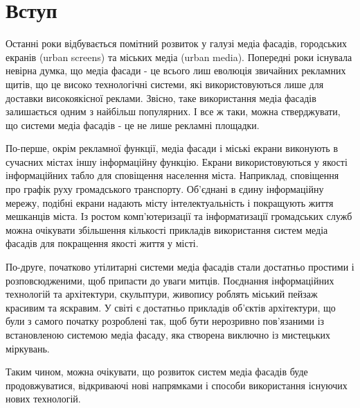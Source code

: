 \documentclass[a4paper,ukrainian,utf8,nocolumnsxix,floatsection,equationsection]{eskdtext}
\newcommand{\sectionnonum}[1]{\section*{#1}\addcontentsline{toc}{section}{#1}}
\begin{document}


{}






\tableofcontents


\sectionnonum{Вступ}
\label{sec:intro}

Останні роки відбувається помітний розвиток у галузі медіа фасадів, городських екранів (urban screens) та міських медіа (urban media). Попередні роки існувала невірна думка, що медіа фасади - це всього лиш еволюція звичайних рекламних щитів, що це високо технологічні системи, які використовуються лише для доставки високоякісної реклами. Звісно, таке використання медіа фасадів залишається одним з найбільш популярних. І все ж таки, можна стверджувати, що системи медіа фасадів - це не лише рекламні площадки. 

По-перше, окрім рекламної функції, медіа фасади і міські екрани виконують в сучасних містах іншу інформаційну функцію. Екрани використовуються у якості інформаційних табло для сповіщення населення міста. Наприклад, сповіщення про графік руху громадського транспорту. Об’єднані в єдину інформаційну мережу, подібні екрани надають місту інтелектуальність і покращують життя мешканців міста. Із ростом комп’ютеризації та інформатизації громадських служб можна очікувати збільшення кількості прикладів використання систем медіа фасадів для покращення якості життя у місті.

По-друге, початково утілитарні системи медіа фасадів стали достатньо простими і розповсюдженими, щоб припасти до уваги митців. Поєднання інформаційних технологій та архітектури, скульптури, живопису роблять міський пейзаж красивим та яскравим. У світі є достатньо прикладів об’єктів архітектури, що були з самого початку розроблені так, щоб бути нерозривно пов’язаними із встановленою системою медіа фасаду, яка створена виключно із мистецьких міркувань. 

Таким чином, можна очікувати, що розвиток систем медіа фасадів буде продовжуватися, відкриваючі нові напрямками і способи використання існуючих нових технологій. 
\end{document}
